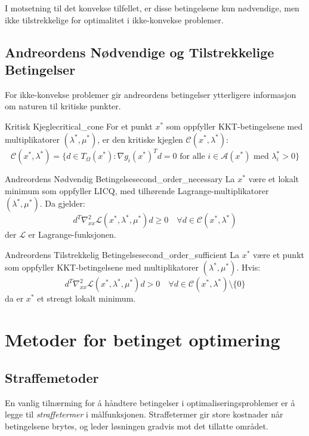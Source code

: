 I motsetning til det konvekse tilfellet, er disse betingelsene kun nødvendige, men ikke tilstrekkelige for optimalitet i ikke-konvekse problemer.

\section{Andreordens Nødvendige og Tilstrekkelige Betingelser}

For ikke-konvekse problemer gir andreordens betingelser ytterligere informasjon om naturen til kritiske punkter.

\begin{definition}{Kritisk Kjegle}{critical_cone}
    For et punkt \( x^* \) som oppfyller KKT-betingelsene med multiplikatorer \( (\lambda^*, \mu^*) \), er den kritiske kjeglen \( \mathcal{C}(x^*, \lambda^*) \):
    \[
        \mathcal{C}(x^*, \lambda^*) = \{d \in T_\Omega(x^*) : \nabla g_i(x^*)^T d = 0 \text{ for alle } i \in \mathcal{A}(x^*) \text{ med } \lambda_i^* > 0\}
    \]
\end{definition}

\begin{theorem}{Andreordens Nødvendig Betingelse}{second_order_necessary}
    La \( x^* \) være et lokalt minimum som oppfyller LICQ, med tilhørende Lagrange-multiplikatorer \( (\lambda^*, \mu^*) \). Da gjelder:
    \[
        d^T \nabla^2_{xx} \mathcal{L}(x^*, \lambda^*, \mu^*) d \geq 0 \quad \forall d \in \mathcal{C}(x^*, \lambda^*)
    \]
    der \( \mathcal{L} \) er Lagrange-funksjonen.
\end{theorem}

\begin{theorem}{Andreordens Tilstrekkelig Betingelse}{second_order_sufficient}
    La \( x^* \) være et punkt som oppfyller KKT-betingelsene med multiplikatorer \( (\lambda^*, \mu^*) \). Hvis:
    \[
        d^T \nabla^2_{xx} \mathcal{L}(x^*, \lambda^*, \mu^*) d > 0 \quad \forall d \in \mathcal{C}(x^*, \lambda^*) \setminus \{0\}
    \]
    da er \( x^* \) et strengt lokalt minimum.
\end{theorem}

\chapter{Metoder for betinget optimering}

\section{Straffemetoder}
En vanlig tilnærming for å håndtere betingelser i optimaliseringsproblemer er å legge til \emph{straffetermer} i målfunksjonen. Straffetermer gir store kostnader når betingelsene brytes, og leder løsningen gradvis mot det tillatte området.

